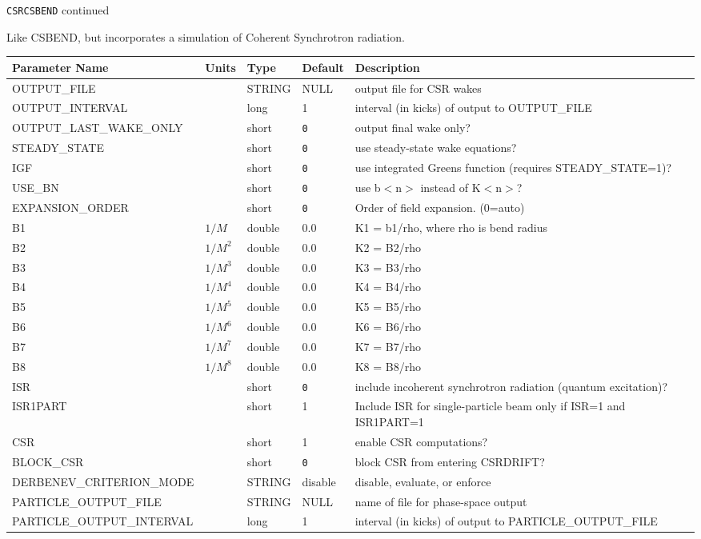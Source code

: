 \newpage
\begin{center}{\Large\verb|CSRCSBEND| continued}\end{center}
Like CSBEND, but incorporates a simulation of Coherent Synchrotron radiation.
\\
\begin{tabular}{|l|l|l|l|p{\descwidth}|} \hline
Parameter Name & Units & Type & Default & Description \\ \hline 
OUTPUT\_FILE &  & STRING &   NULL            & output file for CSR wakes  \\ \hline 
OUTPUT\_INTERVAL &  & long &   1               & interval (in kicks) of output to OUTPUT\_FILE  \\ \hline 
OUTPUT\_LAST\_WAKE\_ONLY &  & short &  \verb|0| & output final wake only?  \\ \hline 
STEADY\_STATE &  & short &  \verb|0| & use steady-state wake equations?  \\ \hline 
IGF &  & short &  \verb|0| & use integrated Greens function (requires STEADY\_STATE=1)?  \\ \hline 
USE\_BN &  & short &  \verb|0| & use b$<$n$>$ instead of K$<$n$>$?  \\ \hline 
EXPANSION\_ORDER &  & short &  \verb|0| & Order of field expansion. (0=auto)  \\ \hline 
B1 & $1/M$ & double &  0.0 & K1 = b1/rho, where rho is bend radius  \\ \hline 
B2 & $1/M^{2}$ & double &  0.0 & K2 = B2/rho  \\ \hline 
B3 & $1/M^{3}$ & double &  0.0 & K3 = B3/rho  \\ \hline 
B4 & $1/M^{4}$ & double &  0.0 & K4 = B4/rho  \\ \hline 
B5 & $1/M^{5}$ & double &  0.0 & K5 = B5/rho  \\ \hline 
B6 & $1/M^{6}$ & double &  0.0 & K6 = B6/rho  \\ \hline 
B7 & $1/M^{7}$ & double &  0.0 & K7 = B7/rho  \\ \hline 
B8 & $1/M^{8}$ & double &  0.0 & K8 = B8/rho  \\ \hline 
ISR &  & short &  \verb|0| & include incoherent synchrotron radiation (quantum excitation)?  \\ \hline 
ISR1PART &  & short &   1               & Include ISR for single-particle beam only if ISR=1 and ISR1PART=1  \\ \hline 
CSR &  & short &   1               & enable CSR computations?  \\ \hline 
BLOCK\_CSR &  & short &  \verb|0| & block CSR from entering CSRDRIFT?  \\ \hline 
DERBENEV\_CRITERION\_MODE &  & STRING &   disable         & disable, evaluate, or enforce  \\ \hline 
PARTICLE\_OUTPUT\_FILE &  & STRING &   NULL            & name of file for phase-space output  \\ \hline 
PARTICLE\_OUTPUT\_INTERVAL &  & long &   1               & interval (in kicks) of output to PARTICLE\_OUTPUT\_FILE  \\ \hline 
\end{tabular}

